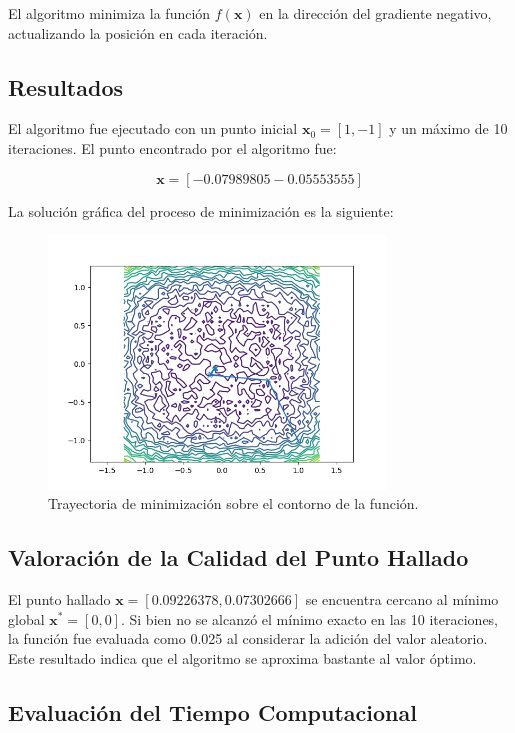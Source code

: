 \documentclass{article}
\begin{document}
	El algoritmo minimiza la función $f(\mathbf{x})$ en la dirección del gradiente negativo, actualizando la posición en cada iteración.
	
	\subsection{Resultados}
	
	El algoritmo fue ejecutado con un punto inicial $\mathbf{x}_0 = [1, -1]$ y un máximo de 10 iteraciones. El punto encontrado por el algoritmo fue:
	
	$$
	\mathbf{x} =  [-0.07989805 -0.05553555]
	$$
	
	La solución gráfica del proceso de minimización es la siguiente:
	
	\begin{figure}[h!]
		\centering
		\includegraphics[width=0.8\textwidth]{resultado1.png}
		\caption{Trayectoria de minimización sobre el contorno de la función.}
		\label{fig:resultado}
	\end{figure}
	
	\subsection{Valoración de la Calidad del Punto Hallado}
	
	El punto hallado $\mathbf{x} = [0.09226378, 0.07302666]$ se encuentra cercano al mínimo global $\mathbf{x}^* = [0, 0]$. Si bien no se alcanzó el mínimo exacto en las 10 iteraciones, la función fue evaluada como 0.025 al considerar la adición del valor aleatorio. Este resultado indica que el algoritmo se aproxima bastante al valor óptimo.
	
	\subsection{Evaluación del Tiempo Computacional}
	
\end{document}
